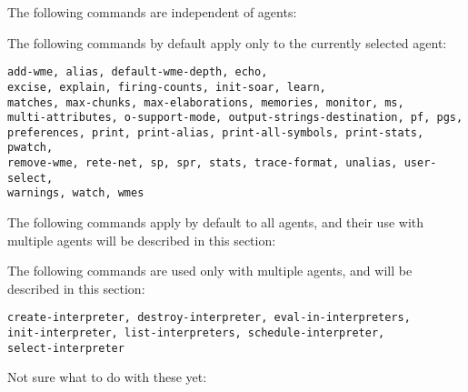 {

The following commands are independent of agents:

 \vspace{12pt}


The following commands by default apply only to the currently selected agent:

\begin{verbatim}
add-wme, alias, default-wme-depth, echo, 
excise, explain, firing-counts, init-soar, learn, 
matches, max-chunks, max-elaborations, memories, monitor, ms, 
multi-attributes, o-support-mode, output-strings-destination, pf, pgs, 
preferences, print, print-alias, print-all-symbols, print-stats, pwatch, 
remove-wme, rete-net, sp, spr, stats, trace-format, unalias, user-select,
warnings, watch, wmes
\end{verbatim} \vspace{12pt}


The following commands apply by default to all agents, and their use with
multiple agents will be described in this section:

  \vspace{12pt}



The following commands are used only with multiple agents, and will be
described in this section:

\begin{verbatim}
create-interpreter, destroy-interpreter, eval-in-interpreters,
init-interpreter, list-interpreters, schedule-interpreter,
select-interpreter
\end{verbatim} \vspace{12pt}


Not sure what to do with these yet:

  \vspace{12pt}




\subsection{ \soar{[-self]}}
\label{run3}

}

